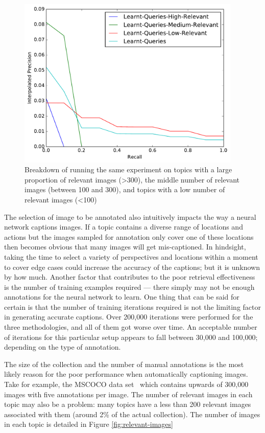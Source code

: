 \begin{figure}[h]
    \centering
    \includegraphics[width=0.95\textwidth]{graphs/learnt-queries}
    \caption{Breakdown of running the same experiment on topics with a large proportion of relevant images (\textgreater 300), the middle number of relevant images (between 100 and 300), and topics with a low number of relevant images (\textless 100)}
    \label{fig:learnt-queries}
\end{figure}

The selection of image to be annotated also intuitively impacts the way a neural network captions images. If a topic contains a diverse range of locations and actions but the images sampled for annotation only cover one of these locations then becomes obvious that many images will get mis-captioned. In hindsight, taking the time to select a variety of perspectives and locations within a moment to cover edge cases could increase the accuracy of the captions; but it is unknown by how much. Another factor that contributes to the poor retrieval effectiveness is the number of training examples required --- there simply may not be enough annotations for the neural network to learn. One thing that can be said for certain is that the number of training iterations required is not the limiting factor in generating accurate captions. Over 200,000 iterations were performed for the three methodologies, and all of them got worse over time. An acceptable number of iterations for this particular setup appears to fall between 30,000 and 100,000; depending on the type of annotation.

The size of the collection and the number of manual annotations is the most likely reason for the poor performance when automatically captioning images. Take for example, the MSCOCO data set~\cite{lin2014microsoft} which contains upwards of 300,000 images with five annotations per image. The number of relevant images in each topic may also be a problem: many topics have a less than 200 relevant images associated with them (around 2\% of the actual collection). The number of images in each topic is detailed in Figure \ref{fig:relevant-images}

